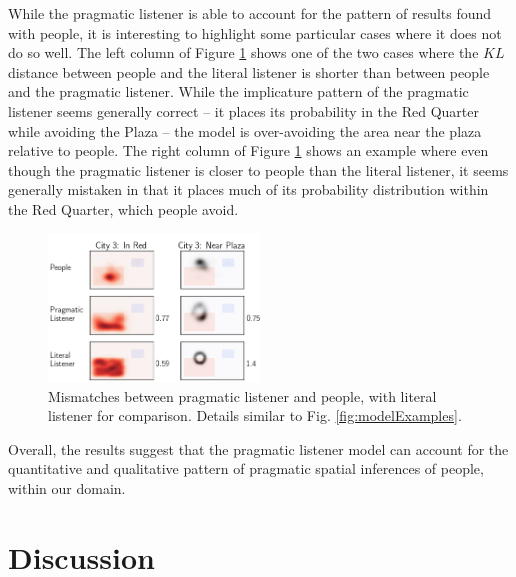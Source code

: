 \documentclass[10pt,letterpaper]{article}
\begin{document}
While the pragmatic listener is able to account for the pattern of results found with people, it is interesting to highlight some particular cases where it does not do so well. The left column of Figure \ref{fig:modelProbs} shows one of the two cases where the $KL$ distance between people and the literal listener is shorter than between people and the pragmatic listener.  While the implicature pattern of the pragmatic listener seems generally correct -- it places its probability in the Red Quarter while avoiding the Plaza -- the model is over-avoiding the area near the plaza relative to people. The right column of Figure \ref{fig:modelProbs} shows an example where even though the pragmatic listener is closer to people than the literal listener, it seems generally mistaken in that it places much of its probability distribution within the Red Quarter, which people avoid. 

\begin{figure}[!h]
\center
\includegraphics[width=0.5\textwidth]{figures/Figure5.png}
\caption{Mismatches between pragmatic listener and people, with literal listener for comparison. Details similar to Fig. \ref{fig:modelExamples}.}
\label{fig:modelProbs}
\end{figure}

Overall, the results suggest that the pragmatic listener model can account for the quantitative and qualitative pattern of pragmatic spatial inferences of people, within our domain.  
\vspace{-10pt}
\section{Discussion}
\end{document}
